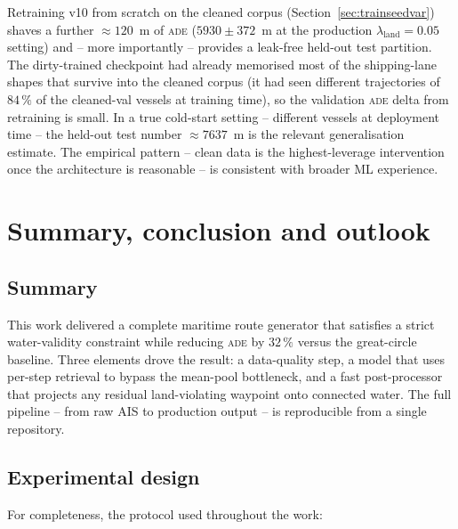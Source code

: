 \documentclass[oneside, a4paper, onecolumn, 11pt]{article}
\newcommand{\ade}{\textsc{ade}}
\begin{document}
Retraining v10 from scratch on the cleaned corpus
(Section~\ref{sec:trainseedvar}) shaves a further $\approx 120$~m of
\ade{} ($5930 \pm 372$~m at the production
$\lambda_{\mathrm{land}} = 0.05$ setting) and -- more importantly --
provides a leak-free held-out test partition.  The dirty-trained
checkpoint had already memorised most of the shipping-lane shapes
that survive into the cleaned corpus (it had seen different
trajectories of $84\,\%$ of the cleaned-val vessels at training time),
so the validation \ade{} delta from retraining is small.  In a true
cold-start setting -- different vessels at deployment time -- the
held-out test number $\approx 7637$~m is the relevant generalisation
estimate.
The empirical pattern -- clean data is the highest-leverage
intervention once the architecture is reasonable -- is consistent
with broader ML experience.

\section{Summary, conclusion and outlook}\label{sec:conclusion}

\subsection{Summary}

This work delivered a complete maritime route generator that
satisfies a strict water-validity constraint while reducing \ade{}
by $32\,\%$ versus the great-circle baseline.  Three elements drove
the result: a data-quality step, a model that uses per-step
retrieval to bypass the mean-pool bottleneck, and a fast
post-processor that projects any residual land-violating waypoint
onto connected water.  The full pipeline -- from raw AIS to
production output -- is reproducible from a single repository.

\subsection{Experimental design}

For completeness, the protocol used throughout the work:
\end{document}
